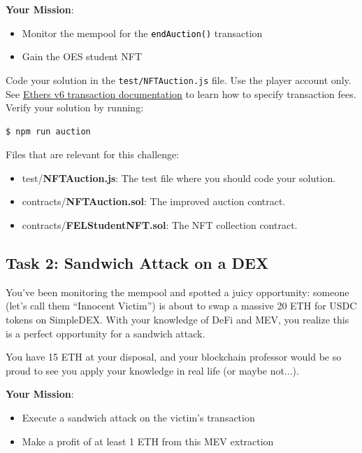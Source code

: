 \documentclass[12pt]{article}
\newcommand{\codegrey}[1]{%
  \texttt{\colorbox{black!4}{\textcolor{black}{#1}}}%
}
\begin{document}
\medskip
\noindent
\textbf{Your Mission}:
\begin{itemize}
    \item Monitor the mempool for the \codegrey{endAuction()} transaction
    \item Gain the OES student NFT
\end{itemize}

\noindent
Code your solution in the \texttt{test/NFTAuction.js} file. Use the player account only. See \href{https://docs.ethers.org/v6/api/transaction/\#Transaction}{Ethers v6 transaction documentation} to learn how to specify transaction fees. Verify your solution by running:

\begin{verbatim}
$ npm run auction
\end{verbatim}

\noindent
Files that are relevant for this challenge:
\begin{itemize}
\item test/\textbf{NFTAuction.js}: The test file where you should code your solution.
\item contracts/\textbf{NFTAuction.sol}: The improved auction contract.
\item contracts/\textbf{FELStudentNFT.sol}: The NFT collection contract.
\end{itemize}

\subsection*{Task 2: Sandwich Attack on a DEX}

You've been monitoring the mempool and spotted a juicy opportunity: someone (let's call them ``Innocent Victim'') is about to swap a massive 20 ETH for USDC tokens on SimpleDEX. With your knowledge of DeFi and MEV, you realize this is a perfect opportunity for a sandwich attack.

You have 15 ETH at your disposal, and your blockchain professor would be so proud to see you apply your knowledge in real life (or maybe not...).

\medskip
\noindent
\textbf{Your Mission}:
\begin{itemize}
  \item Execute a sandwich attack on the victim's transaction
  \item Make a profit of at least 1 ETH from this MEV extraction
\end{itemize}
\end{document}
